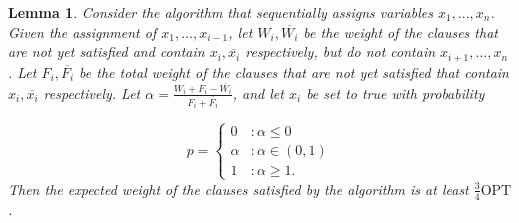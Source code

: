 \documentclass[11pt,letter]{article}
\newtheorem{lemma}[theorem]{Lemma}
\numberwithin{theorem}{section}
\begin{document}
\begin{lemma}
Consider the algorithm that sequentially assigns variables $x_1,...,x_n$. Given the assignment of $x_1,...,x_{i-1}$,
 let $W_i, \overline{W_i}$ be the weight of the clauses that are not yet satisfied and contain $x_i, \overline{x_i}$ respectively,
 but do not contain $x_{i+1}, ..., x_n$. Let $F_i, \overline{F_i}$ be the total weight of the clauses that are not yet satisfied
 that contain $x_i, \overline{x_i}$ respectively. Let $\alpha = \frac{W_i + F_i - \overline{W_i}}{F_i + \overline{F_i}}$, and let $x_i$ be set to true with probability

\begin{displaymath}
  p = \left\{
     \begin{array}{lr}
       0 & : \alpha \leq 0\\
       \alpha & : \alpha \in (0,1) \\
       1 & : \alpha \geq 1.
     \end{array}
   \right.
\end{displaymath}
Then the expected weight of the clauses satisfied by the algorithm is at least $\frac{3}{4} \textrm{OPT}$.
\end{lemma}
\end{document}
